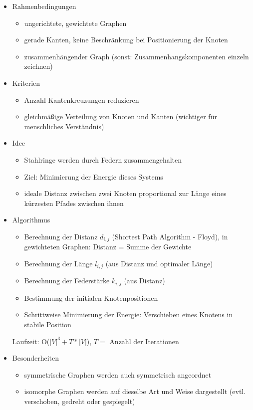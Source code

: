 \documentclass[a4paper,12pt,ngerman]{scrartcl}
\begin{document}
\begin{itemize}
    \item Rahmenbedingungen
    \begin{itemize}
        \item ungerichtete, gewichtete Graphen
        \item gerade Kanten, keine Beschränkung bei Positionierung der Knoten
        \item zusammenhängender Graph (sonst: Zusammenhangskomponenten einzeln zeichnen)
    \end{itemize}
    \item Kriterien
    \begin{itemize}
        \item Anzahl Kantenkreuzungen reduzieren
        \item gleichmäßige Verteilung von Knoten und Kanten (wichtiger für menschliches Verständnis)
    \end{itemize}
    \item Idee
    \begin{itemize}
        \item Stahlringe werden durch Federn zusammengehalten
        \item Ziel: Minimierung der Energie dieses Systems
        \item ideale Distanz zwischen zwei Knoten proportional zur Länge eines kürzesten Pfades zwischen ihnen
    \end{itemize}
    \item Algorithmus
    \begin{itemize}
        \item Berechnung der Distanz $d_{i,j}$  (Shortest Path Algorithm - Floyd), in gewichteten Graphen: Distanz = Summe der Gewichte
        \item Berechnung der Länge $l_{i,j}$ (aus Distanz und optimaler Länge)
        \item Berechnung der Federstärke $k_{i,j}$ (aus Distanz)
        \item Bestimmung der initialen Knotenpositionen
        \item Schrittweise Minimierung der Energie: Verschieben eines Knotens in stabile Position
    \end{itemize}

    Laufzeit: O($|V|^3 + T * |V|$), $T =$ Anzahl der Iterationen

    \item Besonderheiten
    \begin{itemize}
        \item symmetrische Graphen werden auch symmetrisch angeordnet
        \item isomorphe Graphen werden auf dieselbe Art und Weise dargestellt (evtl. verschoben, gedreht oder gespiegelt)
    \end{itemize}
\end{itemize}
\end{document}

